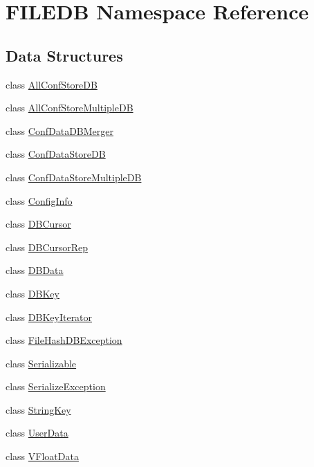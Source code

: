 \hypertarget{namespaceFILEDB}{}\section{F\+I\+L\+E\+DB Namespace Reference}
\label{namespaceFILEDB}
\subsection*{Data Structures}
\begin{DoxyCompactItemize}
\item 
class \mbox{\hyperlink{classFILEDB_1_1AllConfStoreDB}{All\+Conf\+Store\+DB}}
\item 
class \mbox{\hyperlink{classFILEDB_1_1AllConfStoreMultipleDB}{All\+Conf\+Store\+Multiple\+DB}}
\item 
class \mbox{\hyperlink{classFILEDB_1_1ConfDataDBMerger}{Conf\+Data\+D\+B\+Merger}}
\item 
class \mbox{\hyperlink{classFILEDB_1_1ConfDataStoreDB}{Conf\+Data\+Store\+DB}}
\item 
class \mbox{\hyperlink{classFILEDB_1_1ConfDataStoreMultipleDB}{Conf\+Data\+Store\+Multiple\+DB}}
\item 
class \mbox{\hyperlink{classFILEDB_1_1ConfigInfo}{Config\+Info}}
\item 
class \mbox{\hyperlink{classFILEDB_1_1DBCursor}{D\+B\+Cursor}}
\item 
class \mbox{\hyperlink{classFILEDB_1_1DBCursorRep}{D\+B\+Cursor\+Rep}}
\item 
class \mbox{\hyperlink{classFILEDB_1_1DBData}{D\+B\+Data}}
\item 
class \mbox{\hyperlink{classFILEDB_1_1DBKey}{D\+B\+Key}}
\item 
class \mbox{\hyperlink{classFILEDB_1_1DBKeyIterator}{D\+B\+Key\+Iterator}}
\item 
class \mbox{\hyperlink{classFILEDB_1_1FileHashDBException}{File\+Hash\+D\+B\+Exception}}
\item 
class \mbox{\hyperlink{classFILEDB_1_1Serializable}{Serializable}}
\item 
class \mbox{\hyperlink{classFILEDB_1_1SerializeException}{Serialize\+Exception}}
\item 
class \mbox{\hyperlink{classFILEDB_1_1StringKey}{String\+Key}}
\item 
class \mbox{\hyperlink{classFILEDB_1_1UserData}{User\+Data}}
\item 
class \mbox{\hyperlink{classFILEDB_1_1VFloatData}{V\+Float\+Data}}
\end{DoxyCompactItemize}
